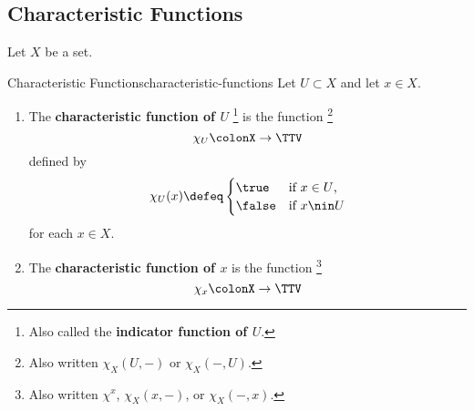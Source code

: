 \subsection{Characteristic Functions}\label{subsection-characteristic-functions}
Let $X$ be a set.
\begin{definition}{Characteristic Functions}{characteristic-functions}%
    Let $U\subset X$ and let $x\in X$.%
    \begin{enumerate}
        \item\label{characteristic-functions-characteristic-function-of-u}The \textbf{characteristic function of $U$}%
            \footnote{%
                Also called the \textbf{indicator function of $U$}.
            } %
            is the function%
            \footnote{%
                Also written $\chi_{X}(U,-)$ or $\chi_{X}(-,U)$.
            }%
            \[%
                \chi_{U}%
                \colon%
                X%
                \to%
                \TTV%
            \]%
            defined by
            \[
                \chi_{U}(x)
                \defeq
                \begin{cases}
                    \true  &\text{if $x\in U$,}\\
                    \false &\text{if $x\nin U$}
                \end{cases}
            \]%
            for each $x\in X$.
        \item\label{characteristic-functions-characteristic-function-of-x}The \textbf{characteristic function of $x$} is the function%
            \footnote{%
                Also written $\chi^{x}$, $\chi_{X}(x,-)$, or $\chi_{X}(-,x)$.
            }%
            \[%
                \chi_{x}%
                \colon%
                X%
                \to%
                \TTV%
            \]%

\end{enumerate}
\end{definition}
